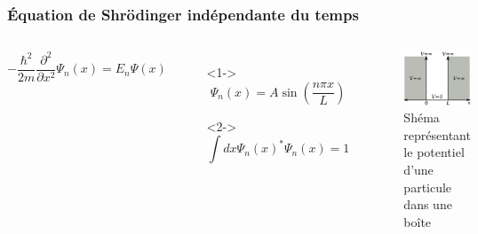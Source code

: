 \documentclass[aspectratio=169]{beamer}
\begin{document}
\begin{frame}
\frametitle{Équation de Shrödinger indépendante du temps}

\begin{columns}

\begin{equation}\tag{4}
-\frac{\hbar^2}{2m}\frac{\partial^2}{\partial x^2}\Psi_n(x)=E_n\Psi(x)
\end{equation} 

\begin{itemize}
\item[]<1-> \begin{equation}\tag{5}
\Psi_n(x)=A\sin(\frac{n\pi x}{L})
\end{equation}  

\item[]<2-> \begin{equation}\tag{6}
\int dx \Psi_n(x)^* \Psi_n(x)=1
\end{equation}  
\end{itemize}
\begin{figure}
\includegraphics[scale=0.4]{Pot}
\caption{Shéma représentant le potentiel d'une particule dans une boîte}
\end{figure}
\end{columns}

\end{frame}
\end{document}
